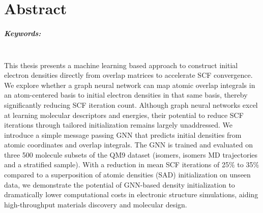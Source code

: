 \chapter*{Abstract}

\paragraph{Keywords:}
\mykeywordsabstract\\

This thesis presents a machine learning based approach to construct initial electron densities directly from overlap matrices to accelerate SCF convergence. We explore whether a graph neural network can map atomic overlap integrals in an atom-centered basis to initial electron densities in that same basis, thereby significantly reducing SCF iteration count. Although graph neural networks excel at learning molecular descriptors and energies, their potential to reduce SCF iterations through tailored initialization remains largely unaddressed. We introduce a simple message passing GNN that predicts initial densities from atomic coordinates and overlap integrals. The GNN is trained and evaluated on three 500 molecule subsets of the QM9 dataset (isomers, isomers MD trajectories and a stratified sample). With a reduction in mean SCF iterations of 25\% to 35\% compared to a superposition of atomic densities (SAD) initialization on unseen data, we demonstrate the potential of GNN-based density initialization to dramatically lower computational costs in electronic structure simulations, aiding high-throughput materials discovery and molecular design.